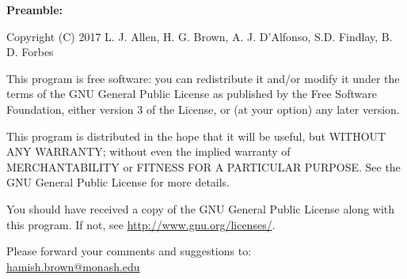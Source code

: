 \documentclass[12pt,a4paper]{article}
\begin{document}
\newpage

\tableofcontents










\vspace{5mm}

\newpage

{\bf Preamble:}

Copyright (C) 2017  L. J. Allen, H. G. Brown, A. J. D’Alfonso, S.D. Findlay, B. D. Forbes

This program is free software: you can redistribute it and/or modify it under the terms of the GNU General Public License as published by  the Free Software Foundation, either version 3 of the License, or  (at your option) any later version.
  
This program is distributed in the hope that it will be useful, but WITHOUT ANY WARRANTY; without even the implied warranty of MERCHANTABILITY or FITNESS FOR A PARTICULAR PURPOSE.  See the GNU General Public License for more details.
   
You should have received a copy of the GNU General Public License along with this program.  If not, see \url{http://www.gnu.org/licenses/}.

Please forward your comments and suggestions to: \\

\href{mailto:hamish.brown@monash.edu}{hamish.brown@monash.edu} \\ 
\end{document}
